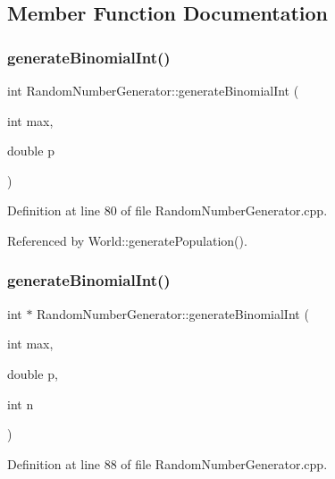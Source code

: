 \subsection{Member Function Documentation}
\mbox{\label{class_random_number_generator_afb806d9e587e8ce8e061d27791f82c04}} 
\subsubsection{generate\+Binomial\+Int()\hspace{0.1cm}{\footnotesize\ttfamily [1/2]}}
{\footnotesize\ttfamily int Random\+Number\+Generator\+::generate\+Binomial\+Int (\begin{DoxyParamCaption}\item[{int}]{max,  }\item[{double}]{p }\end{DoxyParamCaption})}



Definition at line 80 of file Random\+Number\+Generator.\+cpp.



Referenced by World\+::generate\+Population().

\mbox{\label{class_random_number_generator_a5d0d41c12508d3145af5463669b1c4d2}} 
\subsubsection{generate\+Binomial\+Int()\hspace{0.1cm}{\footnotesize\ttfamily [2/2]}}
{\footnotesize\ttfamily int $\ast$ Random\+Number\+Generator\+::generate\+Binomial\+Int (\begin{DoxyParamCaption}\item[{int}]{max,  }\item[{double}]{p,  }\item[{int}]{n }\end{DoxyParamCaption})}



Definition at line 88 of file Random\+Number\+Generator.\+cpp.

